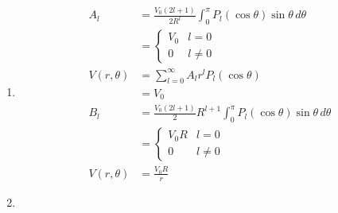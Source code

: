 \documentclass{article}
\begin{document}
\begin{enumerate}
  \item

        \begin{align*}
          A_l          & = \frac{V_0 (2 l + 1)}{2 R^l} \int_0^\pi P_l(\cos \theta) \sin \theta \,d \theta       \\
                       & = \begin{cases}
                             V_0 & l = 0   \\
                             0   & l \ne 0
                           \end{cases}                                                                        \\
          V(r, \theta) & = \sum_{l = 0}^\infty A_l r^l P_l (\cos \theta)                                        \\
                       & = V_0                                                                                  \\
          B_l          & = \frac{V_0 (2 l + 1)}{2} R^{l + 1} \int_0^\pi P_l(\cos \theta) \sin \theta \,d \theta \\
                       & = \begin{cases}
                             V_0 R & l = 0   \\
                             0     & l \ne 0
                           \end{cases}                                                                      \\
          V(r, \theta) & = \frac{V_0 R}{r}
        \end{align*}

  \item


\end{enumerate}
\end{document}
